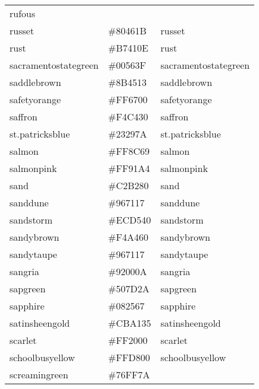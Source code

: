 \documentclass[
]{article}
\begin{document}
\begin{longtable}[]{@{}lll@{}}
\textcolor[rgb]{0.66,0.11,0.03}{rufous                }\tabularnewline
russet & \colorbox[rgb]{0.5,0.27,0.11}{\#80461B} &
\textcolor[rgb]{0.5,0.27,0.11}{russet                }\tabularnewline
rust & \colorbox[rgb]{0.72,0.25,0.05}{\#B7410E} &
\textcolor[rgb]{0.72,0.25,0.05}{rust                  }\tabularnewline
sacramentostategreen & \colorbox[rgb]{0.0,0.34,0.25}{\#00563F} &
\textcolor[rgb]{0.0,0.34,0.25}{sacramentostategreen  }\tabularnewline
saddlebrown & \colorbox[rgb]{0.55,0.27,0.07}{\#8B4513} &
\textcolor[rgb]{0.55,0.27,0.07}{saddlebrown           }\tabularnewline
safetyorange & \colorbox[rgb]{1.0,0.4,0.0}{\#FF6700} &
\textcolor[rgb]{1.0,0.4,0.0}{safetyorange          }\tabularnewline
saffron & \colorbox[rgb]{0.96,0.77,0.19}{\#F4C430} &
\textcolor[rgb]{0.96,0.77,0.19}{saffron               }\tabularnewline
st.patricksblue & \colorbox[rgb]{0.14,0.16,0.48}{\#23297A} &
\textcolor[rgb]{0.14,0.16,0.48}{st.patricksblue       }\tabularnewline
salmon & \colorbox[rgb]{1.0,0.55,0.41}{\#FF8C69} &
\textcolor[rgb]{1.0,0.55,0.41}{salmon                }\tabularnewline
salmonpink & \colorbox[rgb]{1.0,0.57,0.64}{\#FF91A4} &
\textcolor[rgb]{1.0,0.57,0.64}{salmonpink            }\tabularnewline
sand & \colorbox[rgb]{0.76,0.7,0.5}{\#C2B280} &
\textcolor[rgb]{0.76,0.7,0.5}{sand                  }\tabularnewline
sanddune & \colorbox[rgb]{0.59,0.44,0.09}{\#967117} &
\textcolor[rgb]{0.59,0.44,0.09}{sanddune              }\tabularnewline
sandstorm & \colorbox[rgb]{0.93,0.84,0.25}{\#ECD540} &
\textcolor[rgb]{0.93,0.84,0.25}{sandstorm             }\tabularnewline
sandybrown & \colorbox[rgb]{0.96,0.64,0.38}{\#F4A460} &
\textcolor[rgb]{0.96,0.64,0.38}{sandybrown            }\tabularnewline
sandytaupe & \colorbox[rgb]{0.59,0.44,0.09}{\#967117} &
\textcolor[rgb]{0.59,0.44,0.09}{sandytaupe            }\tabularnewline
sangria & \colorbox[rgb]{0.57,0.0,0.04}{\#92000A} &
\textcolor[rgb]{0.57,0.0,0.04}{sangria               }\tabularnewline
sapgreen & \colorbox[rgb]{0.31,0.49,0.16}{\#507D2A} &
\textcolor[rgb]{0.31,0.49,0.16}{sapgreen              }\tabularnewline
sapphire & \colorbox[rgb]{0.03,0.15,0.4}{\#082567} &
\textcolor[rgb]{0.03,0.15,0.4}{sapphire              }\tabularnewline
satinsheengold & \colorbox[rgb]{0.8,0.63,0.21}{\#CBA135} &
\textcolor[rgb]{0.8,0.63,0.21}{satinsheengold        }\tabularnewline
scarlet & \colorbox[rgb]{1.0,0.13,0.0}{\#FF2000} &
\textcolor[rgb]{1.0,0.13,0.0}{scarlet               }\tabularnewline
schoolbusyellow & \colorbox[rgb]{1.0,0.85,0.0}{\#FFD800} &
\textcolor[rgb]{1.0,0.85,0.0}{schoolbusyellow       }\tabularnewline
screamingreen & \colorbox[rgb]{0.46,1.0,0.44}{\#76FF7A} &

\end{longtable}
\end{document}
